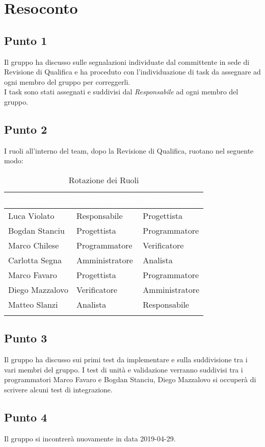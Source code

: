 \section{Resoconto}

\subsection{Punto 1}
Il gruppo ha discusso sulle segnalazioni individuate dal committente in sede di Revisione di Qualifica e ha proceduto con l'individuazione di task da assegnare ad ogni membro del gruppo per correggerli.
\\
I task sono stati assegnati e suddivisi dal \textit{Responsabile} ad ogni membro del gruppo.

\subsection{Punto 2}
I ruoli all'interno del team, dopo la Revisione di Qualifica, ruotano nel seguente modo:\\

\begin{center}
	\begin{longtable}[c]{|m{}|m{}|m{}|} 
		\hline
		\rowcolor{bluelogo}\textbf{\textcolor{white}{Membro}} & \textbf{\textcolor{white}{Vecchio Ruolo}} & \textbf{\textcolor{white}{Nuovo Ruolo}}\\
		\hline
		\hline
		Luca Violato & Responsabile & Progettista \\
		\hline
		\rowcolor{grigio}Bogdan Stanciu & Progettista & Programmatore \\
		\hline
		Marco Chilese & Programmatore & Verificatore\\
		\hline
		\rowcolor{grigio}Carlotta Segna & Amministratore & Analista\\
		\hline
		Marco Favaro & Progettista & Programmatore \\
		\hline
		\rowcolor{grigio} Diego Mazzalovo & Verificatore & Amministratore\\
		\hline
		Matteo Slanzi & Analista & Responsabile\\
		\hline
		\caption{Rotazione dei Ruoli}
	\end{longtable}

\end{center}

\subsection{Punto 3}
Il gruppo ha discusso sui primi test da implementare e sulla suddivisione tra i vari membri del gruppo. 
I test di unità e validazione verranno suddivisi tra i programmatori Marco Favaro e Bogdan Stanciu, Diego Mazzalovo si occuperà di scrivere alcuni test di integrazione.
	

\subsection{Punto 4}
Il gruppo si incontrerà nuovamente in data 2019-04-29.